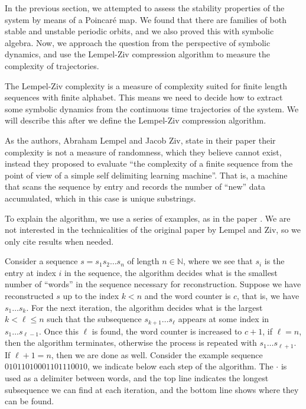In the previous section, we attempted to assess the stability properties of the system by means of a Poincar\'e map. We found that there are families of both stable and unstable periodic orbits, and we also proved this with symbolic algebra. Now, we approach the question from the perspective of symbolic dynamics, and use the Lempel-Ziv compression algorithm to measure the complexity of trajectories.

The Lempel-Ziv complexity is a measure of complexity suited for finite length sequences with finite alphabet. This means we need to decide how to extract some symbolic dynamics from the continuous time trajectories of the system. We will describe this after we define the Lempel-Ziv compression algorithm.

As the authors, Abraham Lempel and Jacob Ziv, state in their paper \cite{LZ76} their complexity is not a measure of randomness, which they believe cannot exist, instead they proposed to evaluate ``the complexity of a finite sequence from the point of view of a simple self delimiting learning machine''. That is, a machine that scans the sequence by entry and records the number of ``new'' data accumulated, which in this case is unique substrings.

To explain the algorithm, we use a series of examples, as in the paper \cite{Kaspar1987EasilyCM}. We are not interested in the technicalities of the original paper by Lempel and Ziv, so we only cite results when needed.

Consider a sequence $s=s_1s_2\dots s_n$ of length $n\in\mathbb N$, where we see that $s_i$ is the entry at index $i$ in the sequence, the algorithm decides what is the smallest number of ``words'' in the sequence necessary for reconstruction. Suppose we have reconstructed $s$ up to the index $k<n$ and the word counter is $c$, that is, we have $s_1\dots s_k$. For the next iteration, the algorithm decides what is the largest $k<\ell\le n$ such that the subsequence $s_{k+1}\dots s_\ell$ appears at some index in $s_1\dots s_{\ell-1}$. Once this $\ell$ is found, the word counter is increased to $c+1$, if $\ell =n$, then the algorithm terminates, otherwise the process is repeated with $s_1\dots s_{\ell+1}$. If $\ell+1 =n$, then we are done as well. Consider the example sequence $01011010001101110010$, we indicate below each step of the algorithm. The $\cdot$ is used as a delimiter between words, and the top line indicates the longest subsequence we can find at each iteration, and the bottom line shows where they can be found.

